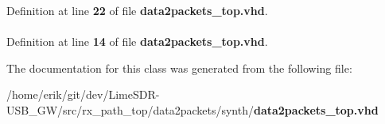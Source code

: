 Definition at line {\bf 22} of file {\bf data2packets\+\_\+top.\+vhd}.

\paragraph[{std\+\_\+logic\+\_\+1164}]{\hspace{0.3cm}{\ttfamily [Package]}}\label{classdata2packets__top_acd03516902501cd1c7296a98e22c6fcb}


Definition at line {\bf 14} of file {\bf data2packets\+\_\+top.\+vhd}.



The documentation for this class was generated from the following file\+:\begin{DoxyCompactItemize}
\item 
/home/erik/git/dev/\+Lime\+S\+D\+R-\/\+U\+S\+B\+\_\+\+G\+W/src/rx\+\_\+path\+\_\+top/data2packets/synth/{\bf data2packets\+\_\+top.\+vhd}\end{DoxyCompactItemize}
